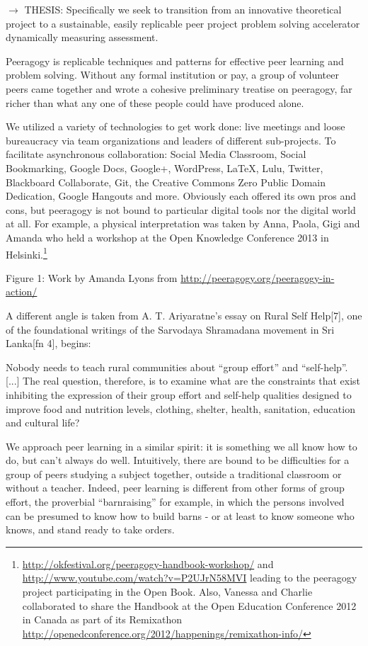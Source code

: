 \documentclass{acm_proc_article-sp}
\begin{document}
$\rightarrow$ THESIS: Specifically we seek to transition from an innovative theoretical project to a sustainable, easily replicable peer project problem solving accelerator dynamically measuring assessment.

Peeragogy is replicable techniques and patterns for effective peer learning and problem solving. Without any formal institution or pay, a group of volunteer peers came together and wrote a cohesive preliminary treatise on peeragogy, far richer than what any one of these people could have produced alone.

We utilized a variety of technologies to get work done: live meetings and loose bureaucracy via team organizations and leaders of different sub-projects. To facilitate asynchronous collaboration: Social Media Classroom, Social Bookmarking, Google Docs, Google+, WordPress, LaTeX, Lulu, Twitter, Blackboard Collaborate, Git, the Creative Commons Zero Public Domain Dedication, Google Hangouts and more. Obviously each offered its own pros and cons, but peeragogy is not bound to particular digital tools nor the digital world at all. For example, a physical interpretation was taken by Anna, Paola, Gigi and Amanda who held a workshop at the Open Knowledge Conference 2013 in Helsinki.\footnote{ \url{http://okfestival.org/peeragogy-handbook-workshop/} and \url{http://www.youtube.com/watch?v=P2UJrN58MVI} leading to the peeragogy project participating in the Open Book. Also, Vanessa and Charlie collaborated to share the Handbook at the Open Education Conference 2012 in Canada as part of its Remixathon \url{http://openedconference.org/2012/happenings/remixathon-info/}}

Figure 1: Work by Amanda Lyons from \url{http://peeragogy.org/peeragogy-in-action/}

A different angle is taken from A. T. Ariyaratne's essay on Rural Self Help[7], one of the foundational writings of the Sarvodaya Shramadana movement in Sri Lanka[fn 4], begins:

Nobody needs to teach rural communities about ``group effort'' and ``self-help''. [...] The real question, therefore, is to examine what are the constraints that exist inhibiting the expression of their group effort and self-help qualities designed to improve food and nutrition levels, clothing, shelter, health, sanitation, education and cultural life?

We approach peer learning in a similar spirit: it is something we all know how to do, but can't always do well. Intuitively, there are bound to be difficulties for a group of peers studying a subject together, outside a traditional classroom or without a teacher. Indeed, peer learning is different from other forms of group effort, the proverbial ``barnraising'' for example, in which the persons involved can be presumed to know how to build barns - or at least to know someone who knows, and stand ready to take orders.
\end{document}
